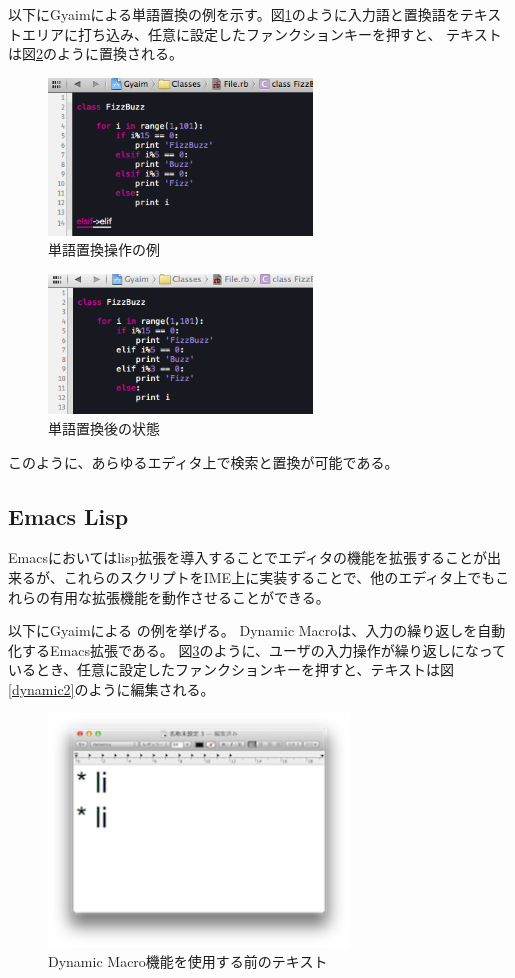 以下にGyaimによる単語置換の例を示す。図\ref{search1}のように入力語と置換語をテキストエリアに打ち込み、任意に設定したファンクションキーを押すと、
テキストは図\ref{search2}のように置換される。

\begin{figure}[H]
\centerline{\includegraphics[width=70mm,bb=0 0 360 215]{figures/search_replace1.png}}
\caption{単語置換操作の例}
\label{search1}
\end{figure}

\begin{figure}[H]
\centerline{\includegraphics[width=70mm,bb=0 0 360 191]{figures/search_replace2.png}}
\caption{単語置換後の状態}
\label{search2}
\end{figure}

このように、あらゆるエディタ上で検索と置換が可能である。

\subsection{Emacs Lisp}
Emacsにおいてはlisp拡張を導入することでエディタの機能を拡張することが出来るが、これらのスクリプトをIME上に実装することで、他のエディタ上でもこれらの有用な拡張機能を動作させることができる。

以下にGyaimによる \cite{DynamicMacro}の例を挙げる。
Dynamic Macroは、入力の繰り返しを自動化するEmacs拡張である。
図\ref{dynamic1}のように、ユーザの入力操作が繰り返しになっているとき、任意に設定したファンクションキーを押すと、テキストは図\ref{dynamic2}のように編集される。

\begin{figure}[H]
\centerline{\includegraphics[width=80mm,bb=0 0 360 190]{figures/dynamic1.png}}
\caption{Dynamic Macro機能を使用する前のテキスト}
\label{dynamic1}
\end{figure}

